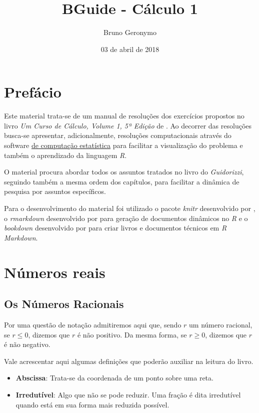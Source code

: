 \documentclass[]{book}
\title{BGuide - Cálculo 1}
\author{Bruno Geronymo}
\date{03 de abril de 2018}
\providecommand{\tightlist}{%
  \setlength{\itemsep}{0pt}\setlength{\parskip}{0pt}}
\begin{document}
\maketitle

{
\setcounter{tocdepth}{1}
\tableofcontents
}
\chapter*{Prefácio}\label{prefacio}

Este material trata-se de um manual de resoluções dos exercícios
propostos no livro \emph{Um Curso de Cálculo, Volume 1, 5ª Edição} de
\citet{guidorizzi2013curso}. Ao decorrer das resoluções busca-se
apresentar, adicionalmente, resoluções computacionais através do
software \href{https://www.r-project.org/}{\citet{R-base} de computação
estatística} para facilitar a visualização do problema e também o
aprendizado da linguagem \emph{R}.

O material procura abordar todos os assuntos tratados no livro do
\emph{Guidorizzi}, seguindo também a mesma ordem dos capítulos, para
facilitar a dinâmica de pesquisa por assuntos específicos.

Para o desenvolvimento do material foi utilizado o pacote \emph{knitr}
desenvolvido por \citet{R-knitr}, o \emph{rmarkdown} desenvolvido por
\citet{R-rmarkdown} para geração de documentos dinâmicos no \emph{R} e o
\emph{bookdown} desenvolvido por \citet{R-bookdown} para criar livros e
documentos técnicos em \emph{R Markdown}.

\chapter{Números reais}\label{numeros-reais}

\section{Os Números Racionais}\label{os-numeros-racionais}

Por uma questão de notação admitiremos aqui que, sendo \(r\) um número
racional, se \(r \leqslant 0\), dizemos que \(r\) é não positivo. Da
mesma forma, se \(r \geqslant 0\), dizemos que \(r\) é não negativo.

Vale acrescentar aqui algumas definições que poderão auxiliar na leitura
do livro.

\begin{itemize}
\tightlist
\item
  \textbf{Abscissa}: Trata-se da coordenada de um ponto sobre uma reta.
\item
  \textbf{Irredutível}: Algo que não se pode reduzir. Uma fração é dita
  irredutível quando está em sua forma mais reduzida possível.
\end{itemize}
\end{document}
